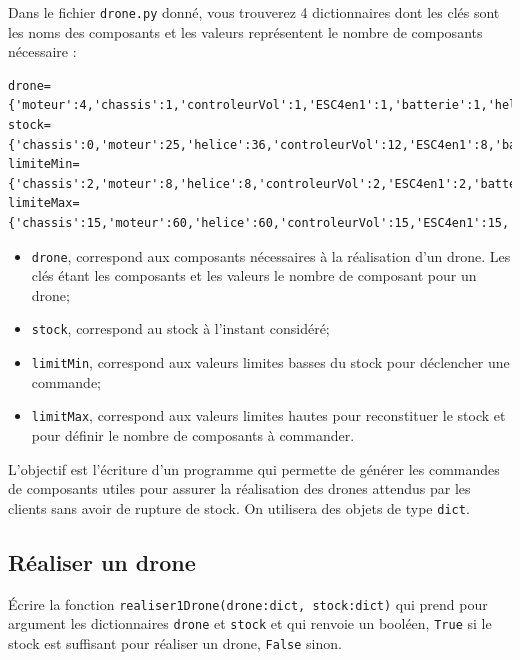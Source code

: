 Dans le fichier \lstinline{drone.py} donné, vous trouverez 4 dictionnaires dont les clés sont les noms des composants et les valeurs représentent le nombre de composants nécessaire :

\begin{lstlisting}
drone={'moteur':4,'chassis':1,'controleurVol':1,'ESC4en1':1,'batterie':1,'helice':4,'plaqueDeDistribution':1}
stock={'chassis':0,'moteur':25,'helice':36,'controleurVol':12,'ESC4en1':8,'batterie':20,'plaqueDeDistribution':7}
limiteMin={'chassis':2,'moteur':8,'helice':8,'controleurVol':2,'ESC4en1':2,'batterie':2,'plaqueDeDistribution':2}
limiteMax={'chassis':15,'moteur':60,'helice':60,'controleurVol':15,'ESC4en1':15,'batterie':30,'plaqueDeDistribution':15}
\end{lstlisting}

\begin{itemize}
\item \lstinline{drone}, correspond aux composants nécessaires à la réalisation d'un drone. Les clés étant les composants et les valeurs le nombre de composant pour un drone;
\item \lstinline{stock}, correspond au stock à l'instant considéré;
\item \lstinline{limitMin}, correspond aux valeurs limites basses du stock pour déclencher une commande;
\item \lstinline{limitMax}, correspond aux valeurs limites hautes pour reconstituer le stock et pour définir le nombre de composants à commander.
\end{itemize}

L'objectif est  l'écriture d'un programme qui permette de générer les commandes de composants utiles pour assurer la réalisation des drones attendus par les clients sans avoir de rupture de stock.
On utilisera des objets de type \lstinline{dict}.

\subsection*{Réaliser un drone}


\begin{question}
\'Ecrire la fonction \lstinline{realiser1Drone(drone:dict, stock:dict)} qui prend pour argument les dictionnaires \lstinline{drone} et \lstinline{stock} et qui renvoie un booléen, \lstinline{True} si le stock est suffisant pour réaliser un drone, \lstinline{False} sinon.
\end{question}

